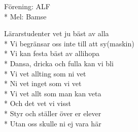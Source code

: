 \begin{SongText}
    \begin{SongInfo}
        Förening: ALF\\*%
        Mel: Bamse
    \end{SongInfo}
    \begin{SongVerse}
        Lärarstudenter vet ju bäst av alla\\*%
        Vi begränsar oss inte till att sy(maskin)\\*%
        Vi kan festa bäst av allihopa\\*%
        Dansa, dricka och fulla kan vi bli\\*%
        Vi vet allting som ni vet\\*%
        Ni vet inget som vi vet\\*%
        Vi vet allt som man kan veta\\*%
        Och det vet vi visst\\*%
        Styr och ställer över er elever\\*%
        Utan oss skulle ni ej vara här
    \end{SongVerse}
\end{SongText}
